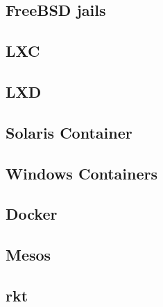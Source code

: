 \subsection{FreeBSD jails}
\label{sec:jails}



\subsection{LXC}
\label{sec:lxc}





\subsection{LXD}
\label{sec:lxd}


\subsection{Solaris Container}
\label{sec:solariscontainer}


\subsection{Windows Containers}
\label{sec:WindowsContainers}

\subsection{Docker}
\label{sec:Docker}

\subsection{Mesos}
\label{sec:Mesos}

\subsection{rkt}
\label{sec:rkt}



